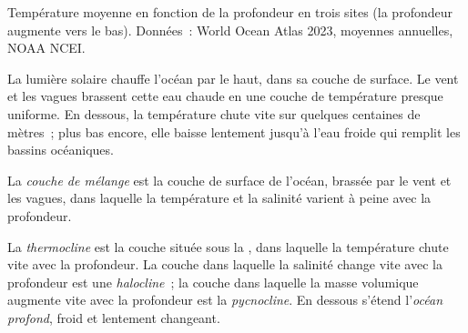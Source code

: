 \begin{omfigure}

{\small Température moyenne en fonction de la profondeur en trois sites (la
profondeur augmente vers le bas). Données~: World Ocean Atlas 2023, moyennes
annuelles, NOAA NCEI.}
\end{omfigure}

La lumière solaire chauffe l'océan par le haut, dans sa couche de surface.
Le vent et les vagues brassent cette eau chaude en une couche de température
presque uniforme. En dessous, la température chute vite sur quelques
centaines de mètres~; plus bas encore, elle baisse lentement jusqu'à l'eau
froide qui remplit les bassins océaniques.

\begin{definition}\label{def:g10:layered-ocean:mixed-layer}
La \emph{couche de mélange} est
la couche de surface de l'océan, brassée par le vent et les vagues, dans
laquelle la température et la salinité varient à peine avec la profondeur.
\end{definition}

\begin{definition}\label{def:g10:layered-ocean:thermocline}
La \emph{thermocline} est la couche située sous la , dans laquelle la température chute vite avec la profondeur. La
couche dans laquelle la salinité change vite avec la profondeur est une
\emph{halocline}~; la couche dans laquelle la masse
volumique augmente vite avec la profondeur est la
\emph{pycnocline}. En dessous s'étend l'\emph{océan
profond}, froid et lentement changeant.
\end{definition}

